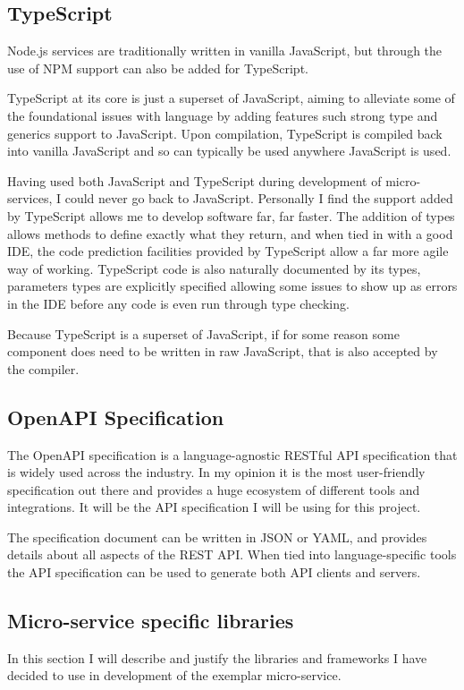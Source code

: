 \subsection{TypeScript}
Node.js services are traditionally written in vanilla JavaScript, but through the use of NPM support can also be added for TypeScript.

TypeScript at its core is just a superset of JavaScript, aiming to alleviate some of the foundational issues with language by adding features such strong type and generics support to JavaScript. Upon compilation, TypeScript is compiled back into vanilla JavaScript and so can typically be used anywhere JavaScript is used.

Having used both JavaScript and TypeScript during development of micro-services, I could never go back to JavaScript. Personally I find the support added by TypeScript allows me to develop software far, far faster. The addition of types allows methods to define exactly what they return, and when tied in with a good IDE, the code prediction facilities provided by TypeScript allow a far more agile way of working. TypeScript code is also naturally documented by its types, parameters types are explicitly specified allowing some issues to show up as errors in the IDE before any code is even run through type checking.

Because TypeScript is a superset of JavaScript, if for some reason some component does need to be written in raw JavaScript, that is also accepted by the compiler.
\subsection{OpenAPI Specification}
The OpenAPI specification is a language-agnostic RESTful API specification that is widely used across the industry. In my opinion it is the most user-friendly specification out there and provides a huge ecosystem of different tools and integrations. It will be the API specification I will be using for this project. 

The specification document can be written in JSON or YAML, and provides details about all aspects of the REST API. When tied into language-specific tools the API specification can be used to generate both API clients and servers.
\subsection{Micro-service specific libraries}

In this section I will describe and justify the libraries and frameworks I have decided to use in development of the exemplar micro-service.

